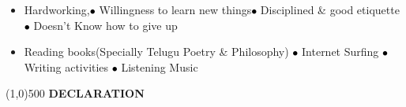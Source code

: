 \documentclass[a4paper]{article}
\begin{document}
\begin{itemize}
	\item[\textcolor{black}{$\bullet$}] \noindent	 Hardworking,\textcolor{black}{$\bullet$} Willingness to learn new things\textcolor{black}{$\bullet$} Disciplined \& good etiquette\textcolor{black}{$\bullet$} Doesn't Know how to give up 
\end{itemize}
\colorbox{mygrey}{\hspace{\linewidth}\hspace{-2\fboxsep}}
\begin{itemize}
	\item Reading books(Specially Telugu Poetry \& Philosophy) \textcolor{black}{$\bullet$} Internet Surfing 
	\textcolor{black}{$\bullet$} Writing activities
	\textcolor{black}{$\bullet$} Listening Music
\end{itemize}
\colorbox{mygrey}{\hspace{\linewidth}\hspace{-2\fboxsep}}
\printbibliography[heading=none]

\begin{center}
\line(1,0){500}
\vspace{1em}
    \textbf{DECLARATION}
\end{center}
\end{document}
